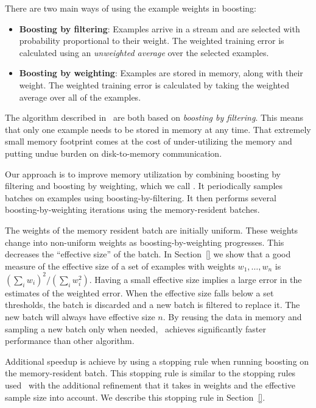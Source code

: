 There are two main ways of using the example weights in boosting:
\begin{itemize}
\item {\bf Boosting by filtering}: Examples arrive in a stream and are
  selected with probability proportional to their weight. The weighted
  training error is calculated using an {\em unweighted average} over
  the selected examples.
\item {\bf Boosting by weighting}: Examples are stored in memory,
  along with their weight. The weighted training error is calculated
  by taking the weighted average over all of the examples.
\end{itemize}
The algorithm described
in~\cite{domingo_scaling_2000,bradley_filterboost:_2007} are both
based on {\em boosting by filtering}. This means that only one example
needs to be stored in memory at any time. That extremely small memory
footprint comes at the cost of under-utilizing the memory and putting
undue burden on disk-to-memory communication.

Our approach is to improve memory utilization by combining boosting by
filtering and boosting by weighting,
which we call \Sparrow.
It periodically samples
batches on examples using boosting-by-filtering. It then performs several
boosting-by-weighting iterations using the memory-resident batches.

The weights of the memory resident batch are initially uniform. These
weights change into non-uniform weights as boosting-by-weighting
progresses. This decreases the ``effective size'' of the batch. In
Section~\ref{} we show that a good measure of the effective size of a
set of examples with weights $w_1,\ldots,w_n$ is $(\sum_i w_i)^2 /
(\sum_i w_i^2)$. Having a small effective size implies a large error
in the estimates of the weighted error. When the effective size falls
below a set thresholds, the batch is discarded and a new batch is
filtered to replace it. The new batch will always have effective size
$n$. By reusing the data in memory and sampling a new batch only when
needed, \Sparrow\ achieves significantly faster performance than
other algorithm.

Additional speedup is achieve by using a stopping rule when
running boosting on the memory-resident batch. This stopping rule is
similar to the stopping rules
used~\cite{domingo_scaling_2000,bradley_filterboost:_2007} with the
additional refinement that it takes in weights and the effective
sample size into account. We describe this stopping rule in Section~\ref{}.
\fi
